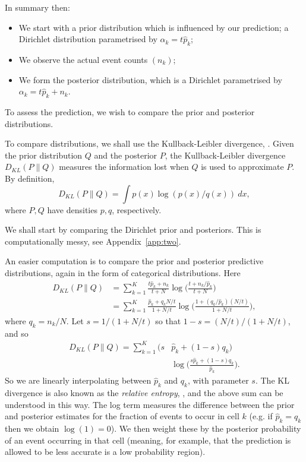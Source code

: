 \documentclass[twoside,a4paper,twocolumn,10pt]{article}
\theoremstyle{plain}
\theoremstyle{definition}
\begin{document}
In summary then:
\begin{itemize}
\item We start with a prior distribution which is influenced by our prediction;
a Dirichlet distribution parametrised by $\alpha_k = t\hat p_k$;
\item We observe the actual event counts $(n_k)$;
\item We form the posterior distribution, which is a Dirichlet parametrised by
$\alpha_k = t\hat p_k + n_k$.
\end{itemize}
To assess the prediction, we wish to compare the prior and posterior distributions.

To compare distributions, we shall use the Kullback-Leibler divergence,
\cite[Section~2.1]{ba}.  Given the prior distribution $Q$ and the posterior $P$, the 
Kullback-Leibler divergence $D_{KL}(P\|Q)$ measures the information lost when $Q$ is
used to approximate $P$.  By definition,
\[ D_{KL}(P\|Q) = \int p(x) \log(p(x) / q(x)) \ dx, \]
where $P,Q$ have densities $p,q$, respectively.

We shall start by comparing the Dirichlet prior and posteriors.  This is computationally
messy, see Appendix~\ref{app:two}.

An easier computation is to compare the prior and posterior predictive distributions,
again in the form of categorical distributions.  Here
\begin{align*}
D_{KL}(P\|Q) &= \sum_{k=1}^K \frac{t\hat p_k+n_k}{t+N} \log\Big(
	\frac{t + n_k / \hat p_k}{t+N} \Big) \\
&= \sum_{k=1}^K \frac{\hat p_k + q_k N/t}{1 + N/t} \log\Big(
	\frac{1 + (q_k/\hat p_k)(N / t)}{1 + N/t} \Big),
\end{align*}
where $q_k = n_k / N$.
Let $s = 1 / (1+N/t)$ so that $1-s = (N/t)/(1+N/t)$, and so
\begin{align*}
D_{KL}(P\|Q) = \sum_{k=1}^K \big( s & \hat p_k + (1-s) q_k \big) \\
    &\log\Big( \frac{s \hat p_k + (1-s)q_k}{\hat p_k} \Big).
\end{align*}
So we are linearly interpolating between $\hat p_k$ and $q_k$, with parameter $s$.
The KL divergence is also known as the \emph{relative entropy}, \cite{mackay}, and
the above sum can be understood in this way.  The log term measures the difference
between the prior and posterior estimates for the fraction of events to occur in cell
$k$ (e.g. if $\hat p_k = q_k$ then we obtain $\log(1)=0$).  We then weight these by
the posterior probability of an event occurring in that cell (meaning, for example,
that the prediction is allowed to be less accurate is a low probability region).
\end{document}
